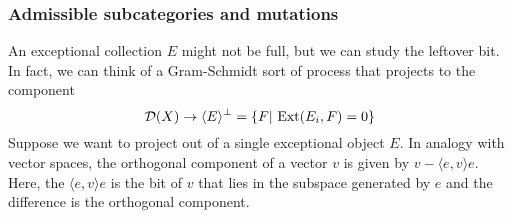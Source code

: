



\subsubsection{Admissible subcategories and mutations}
An exceptional collection $E$ might not be full, but we can study the leftover bit. In fact, we can think of a Gram-Schmidt sort of process that projects to the component $$\mathcal{D}(X)\rightarrow \langle E\rangle^\perp=\{F|\, \operatorname{Ext}(E_i, F)=0\}$$
Suppose we want to project out of a single exceptional object $E$. In analogy with vector spaces, the orthogonal component of a vector $v$ is given by $v-\langle e,v \rangle e$. Here, the $\langle e,v \rangle e$ is the bit of $v$ that lies in the subspace generated by $e$ and the difference is the orthogonal component. 

